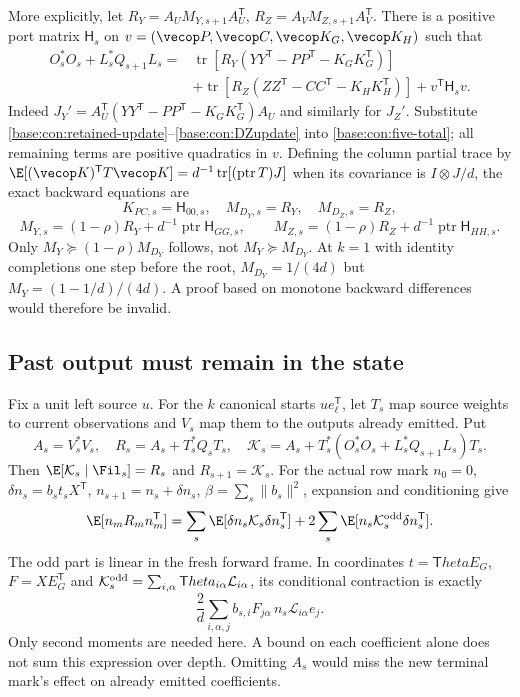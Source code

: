 \documentclass[11pt,oneside,openany,a4paper]{book}
\numberwithin{equation}{chapter}
\theoremstyle{definition}
\theoremstyle{remark}
\newcommand{\T}{\mathsf T}\newcommand{\Id}{I}
\DeclareMathOperator{\tr}{tr}\DeclareMathOperator{\rank}{rank}
\begin{document}
More explicitly, let $R_Y=A_UM_{Y,s+1}A_U^\T$, $R_Z=A_VM_{Z,s+1}A_V^\T$. There is a positive port matrix $\mathsf H_s$ on $v=(\vecop P,\vecop C,\vecop K_G,\vecop K_H)$ such that
\begin{align}
 O_s^*O_s+L_s^*Q_{s+1}L_s
 ={}&\tr[R_Y(YY^\T-PP^\T-K_GK_G^\T)]\nonumber\\
 &+\tr[R_Z(ZZ^\T-CC^\T-K_HK_H^\T)]+v^\T\mathsf H_sv.\label{base:con:ports}
\end{align}
Indeed $J_Y'=A_U^\T(YY^\T-PP^\T-K_GK_G^\T)A_U$ and similarly for $J_Z'$. Substitute \eqref{base:con:retained-update}--\eqref{base:con:DZupdate} into \eqref{base:con:five-total}; all remaining terms are positive quadratics in $v$.
Defining the column partial trace by
$\E[(\vecop K)^\T T\vecop K]=d^{-1}\tr[(\operatorname{ptr}T)J]$ when its covariance is $I\otimes J/d$, the exact backward equations are
\[
 K_{PC,s}=\mathsf H_{00,s},\quad M_{D_Y,s}=R_Y,\quad M_{D_Z,s}=R_Z,
\]
\[
 M_{Y,s}=(1-\rho)R_Y+d^{-1}\operatorname{ptr}\mathsf H_{GG,s},\qquad
 M_{Z,s}=(1-\rho)R_Z+d^{-1}\operatorname{ptr}\mathsf H_{HH,s}.
\]
Only $M_Y\succeq(1-\rho)M_{D_Y}$ follows, not $M_Y\succeq M_{D_Y}$. At $k=1$ with identity completions one step before the root,
$M_{D_Y}=1/(4d)$ but $M_Y=(1-1/d)/(4d)$. A proof based on monotone backward differences would therefore be invalid.

\subsection{Past output must remain in the state}
Fix a unit left source $u$. For the $k$ canonical starts $ue_\ell^\T$, let $T_s$ map source weights to current observations and $V_s$ map them to the outputs already emitted. Put
\[
 A_s=V_s^*V_s,\quad R_s=A_s+T_s^*Q_sT_s,
 \quad\mathcal K_s=A_s+T_s^*(O_s^*O_s+L_s^*Q_{s+1}L_s)T_s.
\]
Then $\E[\mathcal K_s\mid\Fil_s]=R_s$ and $R_{s+1}=\mathcal K_s$. For the actual row mark
$n_0=0$, $\delta n_s=b_st_sX^\T$, $n_{s+1}=n_s+\delta n_s$, $\beta=\sum_s\|b_s\|^2$, expansion and conditioning give
\begin{equation}\label{base:con:bellman-identity}
 \E[n_mR_mn_m^\T]
 =\sum_s\E[\delta n_s\mathcal K_s\delta n_s^\T]
 +2\sum_s\E[n_s\mathcal K_s^{\rm odd}\delta n_s^\T].
\end{equation}
The odd part is linear in the fresh forward frame. In coordinates $t=\T heta E_G$, $F=XE_G^\T$ and
$\mathcal K_s^{\rm odd}=\sum_{i,\alpha}\T heta_{i\alpha}\mathcal L_{i\alpha}$, its conditional contraction is exactly
\[
 \frac2d\sum_{i,\alpha,j}b_{s,i}F_{j\alpha}\,
 n_s\mathcal L_{i\alpha}e_j.
\]
Only second moments are needed here. A bound on each coefficient alone does not sum this expression over depth. Omitting $A_s$ would miss the new terminal mark's effect on already emitted coefficients.
\end{document}
